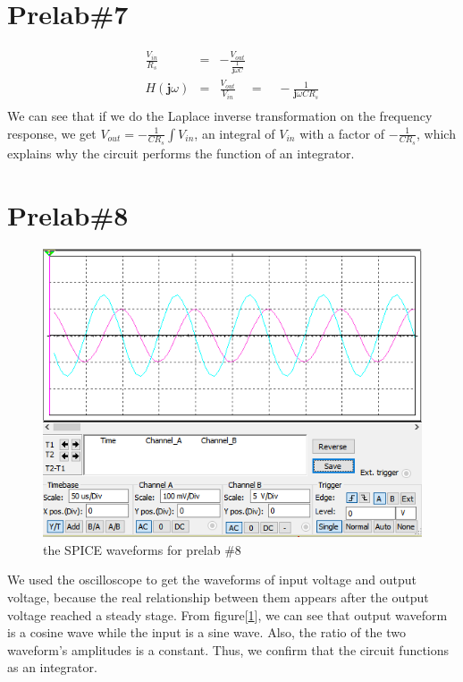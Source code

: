\documentclass{IEEEtran}
\begin{document}
	\section{\textbf{Prelab\#7}}
	\begin{eqnarray*}
		\frac{V_{in}}{R_s} & = & -\frac{V_{out}}{\frac{1}{\mathbf{j}\omega C}}\\
		H(\mathbf{j}\omega) & = & \frac{V_{out}}{V_{in}} \quad = \quad -\frac{1}{\mathbf{j}\omega CR_s}\\
	\end{eqnarray*}
	\phantom{ } We can see that if we do the Laplace inverse transformation on the frequency response, we get $ V_{out} = -\frac{1}{CR_s}\int V_{in} $, an integral of $ V_{in} $ with a factor of $ -\frac{1}{C R_s} $, which explains why the circuit performs the function of an integrator.
	\section{\textbf{Prelab\#8}}
	\begin{figure}[!htbp]
		\centering
		\begin{framed}
			\includegraphics[width=\linewidth]{images/8_2.PNG}
			\caption{the SPICE waveforms for prelab \#8}
			\label{fig:801}
		\end{framed}
	\end{figure}
	\phantom{ } We used the oscilloscope to get the waveforms of input voltage and output voltage, because the real relationship between them appears after the output voltage reached a steady stage. From figure[\ref{fig:801}], we can see that output waveform is a cosine wave while the input is a sine wave. Also, the ratio of the two waveform's amplitudes is a constant. Thus, we confirm that the circuit functions as an integrator.
\end{document}
